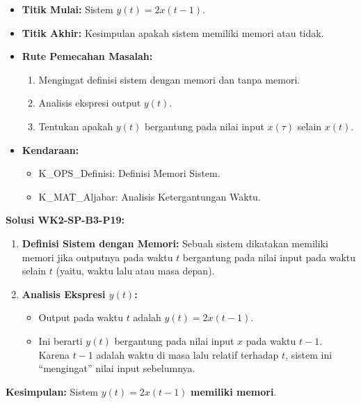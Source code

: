 \documentclass[
  letterpaper,
  DIV=11,
  numbers=noendperiod]{scrreprt}
\providecommand{\tightlist}{%
  \setlength{\itemsep}{0pt}\setlength{\parskip}{0pt}}
\begin{document}
\begin{itemize}
\tightlist
\item
  \textbf{Titik Mulai:} Sistem \(y(t) = 2x(t-1)\).
\item
  \textbf{Titik Akhir:} Kesimpulan apakah sistem memiliki memori atau
  tidak.
\item
  \textbf{Rute Pemecahan Masalah:}

  \begin{enumerate}
  \def\labelenumi{\arabic{enumi}.}
  \tightlist
  \item
    Mengingat definisi sistem dengan memori dan tanpa memori.
  \item
    Analisis ekspresi output \(y(t)\).
  \item
    Tentukan apakah \(y(t)\) bergantung pada nilai input \(x(\tau)\)
    selain \(x(t)\).
  \end{enumerate}
\item
  \textbf{Kendaraan:}

  \begin{itemize}
  \tightlist
  \item
    K\_OPS\_Definisi: Definisi Memori Sistem.
  \item
    K\_MAT\_Aljabar: Analisis Ketergantungan Waktu.
  \end{itemize}
\end{itemize}

\textbf{Solusi WK2-SP-B3-P19:}

\begin{enumerate}
\def\labelenumi{\arabic{enumi}.}
\tightlist
\item
  \textbf{Definisi Sistem dengan Memori:} Sebuah sistem dikatakan
  memiliki memori jika outputnya pada waktu \(t\) bergantung pada nilai
  input pada waktu selain \(t\) (yaitu, waktu lalu atau masa depan).
\item
  \textbf{Analisis Ekspresi \(y(t)\):}

  \begin{itemize}
  \tightlist
  \item
    Output pada waktu \(t\) adalah \(y(t) = 2x(t-1)\).
  \item
    Ini berarti \(y(t)\) bergantung pada nilai input \(x\) pada waktu
    \(t-1\). Karena \(t-1\) adalah waktu di masa lalu relatif terhadap
    \(t\), sistem ini ``mengingat'' nilai input sebelumnya.
  \end{itemize}
\end{enumerate}

\textbf{Kesimpulan:} Sistem \(y(t) = 2x(t-1)\) \textbf{memiliki memori}.
\end{document}
